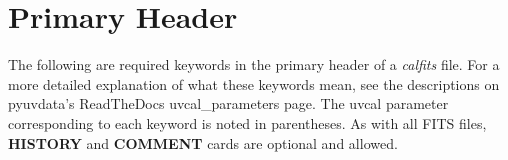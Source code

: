 \documentclass[11pt, oneside, english]{article}   	%
\begin{document}
\section{Primary Header}
The following are required keywords in the primary header of a \emph{calfits} file.
For a more detailed explanation of what these keywords mean, see the descriptions on pyuvdata's ReadTheDocs uvcal\_parameters page. The uvcal parameter corresponding to each keyword is noted in parentheses. 
As with all FITS files, \textbf{HISTORY} and \textbf{COMMENT} cards are optional and allowed.
\end{document}
